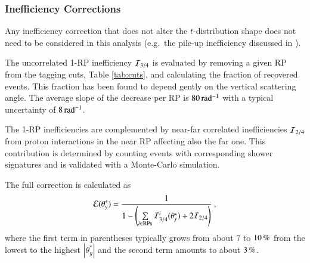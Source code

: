 \subsubsection{Inefficiency Corrections}
\label{sec:ineff corr}

Any inefficiency correction that does not alter the $t$-distribution shape does not need to be considered in this analysis (e.g.~the pile-up inefficiency discussed in \cite{prl111}).

The uncorrelated 1-RP inefficiency ${\cal I}_{3/4}$ is evaluated by removing a given RP from the tagging cuts, Table \ref{tab:cuts}, and calculating the fraction of recovered events. This fraction has been found to depend gently on the vertical scattering angle. The average slope of the decrease per RP is $80\,{\rm rad^{-1}}$ with a typical uncertainty of $8\,{\rm rad^{-1}}$.

The 1-RP inefficiencies are complemented by near-far correlated inefficiencies ${\cal I}_{2/4}$ from proton interactions in the near RP affecting also the far one. This contribution is determined by counting events with corresponding shower signatures and is validated with a Monte-Carlo simulation.

The full correction is calculated as
\begin{equation}
\label{efficiency}
	{\cal E}(\theta_y^*) = {1\over 1 - \left( \sum\limits_{i\in \rm RPs} {\cal I}^i_{3/4}(\theta_y^*) + 2 {\cal I}_{2/4} \right) } \ ,
\end{equation}
where the first term in parentheses typically grows from about $7$ to $10\,{\rm \%}$ from the lowest to the highest $|\theta_y^*|$ and the second term amounts to about $3\,{\rm \%}$.


